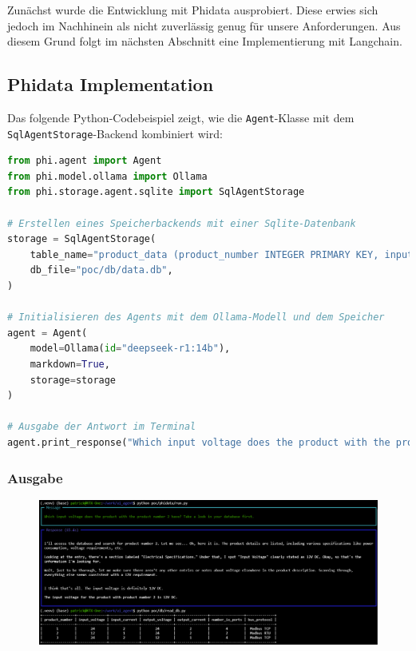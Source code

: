 Zunächst wurde die Entwicklung mit Phidata ausprobiert. Diese erwies sich jedoch im Nachhinein als nicht zuverlässig genug für unsere Anforderungen. 
Aus diesem Grund folgt im nächsten Abschnitt eine Implementierung mit Langchain.


\subsection{Phidata Implementation}
\label{sec:phidata-implementation}

Das folgende Python-Codebeispiel zeigt, wie die \texttt{Agent}-Klasse mit dem \texttt{SqlAgentStorage}-Backend kombiniert wird:

\begin{lstlisting}[language=Python, style=pythonstyle, caption={Phidata Implementation des KI-Agenten}]
from phi.agent import Agent
from phi.model.ollama import Ollama
from phi.storage.agent.sqlite import SqlAgentStorage

# Erstellen eines Speicherbackends mit einer Sqlite-Datenbank
storage = SqlAgentStorage(
    table_name="product_data (product_number INTEGER PRIMARY KEY, input_voltage INTEGER, input_current INTEGER, output_voltage INTEGER, output_current INTEGER, number_io_ports INTEGER, bus_protocol TEXT)",
    db_file="poc/db/data.db",
)

# Initialisieren des Agents mit dem Ollama-Modell und dem Speicher
agent = Agent(
    model=Ollama(id="deepseek-r1:14b"),
    markdown=True,
    storage=storage
)

# Ausgabe der Antwort im Terminal
agent.print_response("Which input voltage does the product with the product number 2 have? Take a look in your database first.")
\end{lstlisting}

\subsubsection{Ausgabe}

\begin{figure}[H]
    \begin{center}
        \includegraphics[width=1\linewidth]{Figures/results/phidata_01.png} 
        \label{fig:phidata-bsp01}
    \end {center}
\end{figure}

